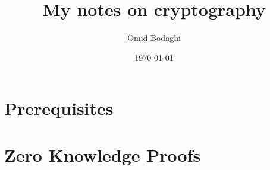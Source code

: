 \documentclass[11pt, a4paper]{book}
\begin{document}
\frontmatter
\title{My notes on cryptography}
\author{Omid Bodaghi}
\date{\today}
\maketitle
\tableofcontents

\mainmatter
\part{Prerequisites}

\part{Zero Knowledge Proofs}
% 

\backmatter
\end{document}
